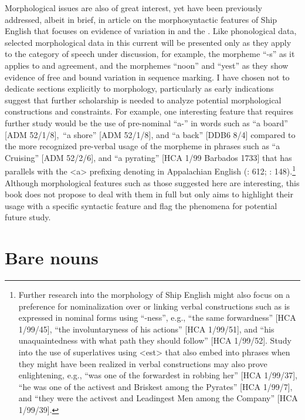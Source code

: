 Morphological issues are also of great interest, yet have been previously addressed, albeit in brief, in  article on the morphosyntactic features of Ship English that focuses on evidence of variation in  and the . Like phonological data, selected morphological data in this current  will be presented only as they apply to the category of speech under discussion, for example, the morpheme “-s” as it applies to  and   agreement, and the morphemes “noon” and “yest” as they show evidence of free and bound variation in sequence marking. I have chosen not to dedicate sections explicitly to morphology, particularly as early indications suggest that further scholarship is needed to analyze potential morphological constructions and constraints. For example, one interesting feature that requires further study would be the use of pre-nominal “a-” in words such as “a board” [ADM 52/1/8],~“a shore” [ADM 52/1/8], and “a back” [DDB6 8/4] compared to the more recognized pre-verbal usage of the morpheme in phrases such as “a Cruising” [ADM 52/2/6], and “a pyrating” [HCA 1/99 Barbados {1733}] that has parallels with the <a> prefixing denoting  in Appalachian English (\citealt{Hickey2004}: 612; \citealt{Montgomery2001}: 148).\footnote{Further research into the morphology of Ship English might also focus on a preference for nominalization over  or linking verbal constructions such as is expressed in nominal forms using “-ness”, e.g., “the same forwardness” [HCA 1/99/45], “the involuntaryness of his actions” [HCA 1/99/51], and “his unaquaintedness with what path they should follow” [HCA 1/99/52]. Study into the use of  superlatives using <est> that also embed into  phrases when they might have been realized in verbal constructions may also prove enlightening, e.g., “was one of the forwardest in robbing her” [HCA 1/99/37], “he was one of the activest and Briskest among the Pyrates” [HCA 1/99/7], and “they were the activest and Leadingest Men among the Company” [HCA 1/99/39].} Although morphological features such as those suggested here are interesting, this book does not propose to deal with them in full but only aims to highlight their usage with a specific syntactic feature and flag the phenomena for potential future study. 

\section{{Bare nouns}}\label{sec:5.2}

